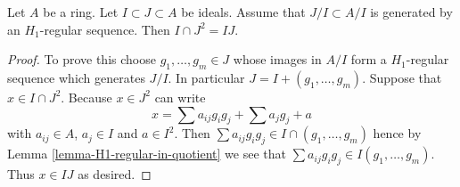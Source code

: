 \begin{lemma}
\label{lemma-conormal-sequence-H1-regular}
Let $A$ be a ring. Let $I \subset J \subset A$ be ideals.
Assume that $J/I \subset A/I$ is generated by an $H_1$-regular sequence.
Then $I \cap J^2 = IJ$.
\end{lemma}

\begin{proof}
To prove this choose $g_1, \ldots, g_m \in J$
whose images in $A/I$ form a $H_1$-regular sequence which generates $J/I$.
In particular $J = I + (g_1, \ldots, g_m)$.
Suppose that $x \in I \cap J^2$. Because $x \in J^2$ can write
$$
x =
\sum a_{ij} g_ig_j +
\sum a_j g_j +
a
$$
with $a_{ij} \in A$, $a_j \in I$ and $a \in I^2$.
Then $\sum a_{ij}g_ig_j \in I \cap (g_1, \ldots, g_m)$
hence by
Lemma \ref{lemma-H1-regular-in-quotient}
we see that $\sum a_{ij}g_ig_j \in I(g_1, \ldots, g_m)$.
Thus $x \in IJ$ as desired.
\end{proof}

